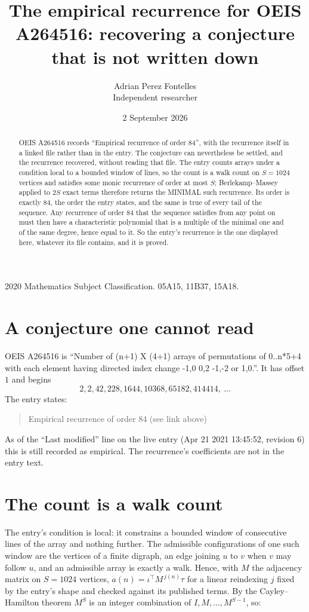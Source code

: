 \documentclass[11pt,a4paper]{article}
\title{The empirical recurrence for OEIS A264516: recovering a conjecture that is not written down}
\author{Adrian Perez Fontelles\\ \small Independent researcher}
\date{2 September 2026}
\theoremstyle{plain}
\theoremstyle{definition}
\begin{document}
\maketitle

\begin{abstract}
OEIS A264516 records ``Empirical recurrence of order $84$'', with the recurrence itself in a
linked file rather than in the entry. The conjecture can nevertheless be settled, and the
recurrence recovered, without reading that file. The entry counts arrays under a condition
local to a bounded window of lines, so the count is a walk count on $S=1024$ vertices and
satisfies some monic recurrence of order at most $S$; Berlekamp--Massey applied to $2S$ exact
terms therefore returns the MINIMAL such recurrence. Its order is exactly $84$, the order
the entry states, and the same is true of every tail of the sequence. Any recurrence of order
$84$ that the sequence satisfies from any point on must then have a characteristic
polynomial that is a multiple of the minimal one and of the same degree, hence equal to it. So
the entry's recurrence is the one displayed here, whatever its file contains, and it is
proved.
\end{abstract}

\noindent\small 2020 Mathematics Subject Classification. 05A15, 11B37, 15A18.\normalsize

\section{A conjecture one cannot read}

OEIS A264516 is ``Number of (n+1) X (4+1) arrays of permutations of 0..n*5+4 with each element having directed index change -1,0 0,2 -1,-2 or 1,0.''. It has offset $1$ and begins
\[
2, 2, 42, 228, 1644, 10368, 65182, 414414,\ \dots
\]
The entry states:
\begin{quote}
Empirical recurrence of order 84 (see link above)
\end{quote}
As of the ``Last modified'' line on the live entry (Apr 21 2021 13:45:52, revision 6) this is still
recorded as empirical. The recurrence's coefficients are not in the entry text.

\section{The count is a walk count}

The entry's condition is local: it constrains a bounded window of consecutive lines of the
array and nothing further. The admissible configurations of one such window are the vertices
of a finite digraph, an edge joining $u$ to $v$ when $v$ may follow $u$, and an admissible
array is exactly a walk. Hence, with $M$ the adjacency matrix on $S=1024$ vertices,
$a(n)=\iota^{\!\top}M^{\,j(n)}\tau$ for a linear reindexing $j$ fixed by the entry's shape
and checked against its published terms. By the Cayley--Hamilton theorem $M^{S}$ is an
integer combination of $I,M,\dots,M^{S-1}$, so:
\end{document}
